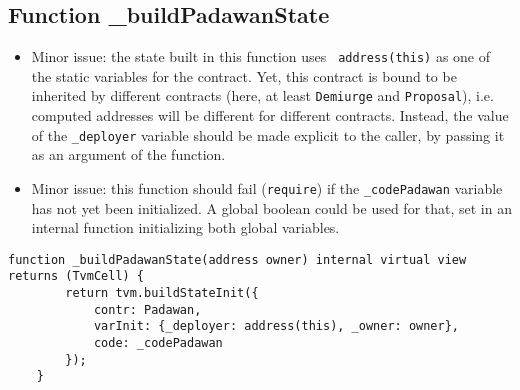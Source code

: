 \subsection{Function \_{}buildPadawanState}


\begin{itemize}
\item Minor issue: the state built in this function uses {\tt
  address(this)} as one of the static variables for the contract. Yet,
  this contract is bound to be inherited by different contracts (here,
  at least {\tt Demiurge} and {\tt Proposal}), i.e. computed addresses
  will be different for different contracts. Instead, the value of the
  {\tt \_deployer} variable should be made explicit to the caller, by
  passing it as an argument of the function.
\item Minor issue: this function should fail ({\tt require}) if the
  {\tt \_codePadawan} variable has not yet been initialized. A global
  boolean could be used for that, set in an internal function
  initializing both global variables.
\end{itemize}

\begin{lstlisting}[firstnumber=16]
    function _buildPadawanState(address owner) internal virtual view returns (TvmCell) {
        return tvm.buildStateInit({
            contr: Padawan,
            varInit: {_deployer: address(this), _owner: owner},
            code: _codePadawan
        });
    }
\end{lstlisting}

